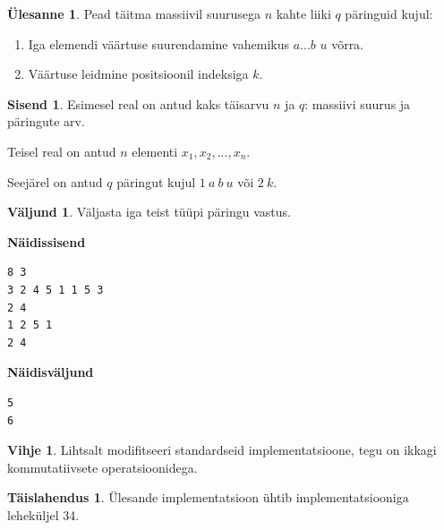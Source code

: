\documentclass{trkut}
\theoremstyle{definition}
\newtheorem*{vihje}{Vihje}
\newtheorem*{solution}{Täislahendus}
\newtheorem*{Input}{Sisend}
\newtheorem*{Output}{Väljund}
\newtheorem*{Text}{Ülesanne}
\begin{document}
\begin{Text}
Pead täitma massiivil suurusega $n$ kahte liiki $q$ päringuid kujul:
\begin{enumerate}
\item Iga elemendi väärtuse suurendamine vahemikus $a...b$ $u$ võrra.
\item Väärtuse leidmine positsioonil indeksiga $k$.
\end{enumerate}

\parencite{update}
\end{Text}

\begin{Input}
Esimesel real on antud kaks täisarvu $n$ ja $q$: massiivi suurus ja päringute arv.

Teisel real on antud $n$ elementi $x_1,x_2,...,x_n$.

Seejärel on antud $q$ päringut kujul $1\ a\ b\ u$ või $2\ k$.
\end{Input}
\begin{Output}
Väljasta iga teist tüüpi päringu vastus.
\end{Output}

\textbf{Näidissisend}

\begin{verbatim}
8 3
3 2 4 5 1 1 5 3
2 4
1 2 5 1
2 4
\end{verbatim}

\textbf{Näidisväljund}

\begin{verbatim}
5
6
\end{verbatim}


\begin{vihje}
Lihtsalt modifitseeri standardseid implementatsioone, tegu on ikkagi kommutatiivsete operatsioonidega.
\end{vihje}

\begin{solution}
Ülesande implementatsioon ühtib implementatsiooniga leheküljel 34.
\end{solution}
\end{document}
